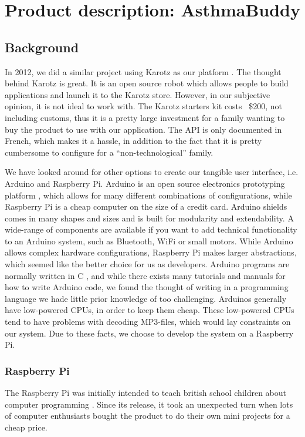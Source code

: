 
\chapter{Product description: AsthmaBuddy}
\label{chp:our-solution}

\section{Background}
In 2012, we did a similar project using Karotz  as our platform \cite{CustomerDriven}. The thought behind Karotz is great. It is an open source robot which allows people to build applications and launch it to the Karotz store. However, in our subjective opinion, it is not ideal to work with. The Karotz starters kit costs ~\$200, not including customs, thus it is a pretty large investment for a family wanting to buy the product to use with our application. The API is only documented in French, which makes it a hassle, in addition to the fact that it is pretty cumbersome to configure for a ``non-technological'' family. 


We have looked around for other options to create our tangible user interface, i.e. Arduino and Raspberry Pi. Arduino is an open source electronics prototyping platform \cite{arduino}, which allows for many different combinations of configurations, while Raspberry Pi is a cheap computer on the size of a credit card. Arduino shields comes in many shapes and sizes and is built for modularity and extendability. A wide-range of components are available if you want to add technical functionality to an Arduino system, such as Bluetooth, WiFi or small motors. 
While Arduino allows complex hardware configurations, Raspberry Pi makes larger abstractions, which seemed like the better choice for us as developers. Arduino programs are normally written in C \cite{strahl2000language}, and while there exists many tutorials and manuals for how to write Arduino code, we found the thought of writing in a programming language we hade little prior knowledge of too challenging. Arduinos generally have low-powered CPUs, in order to keep them cheap. These low-powered CPUs tend to have problems with decoding MP3-files, which would lay constraints on our system. Due to these facts, we choose to develop the system on a Raspberry Pi.


\subsection{Raspberry Pi}
The Raspberry Pi was initially intended to teach british school children about computer programming \cite{rasperrypi-about}. Since its release, it took an unexpected turn when lots of computer enthusiasts bought the product to do their own mini projects for a cheap price. 

